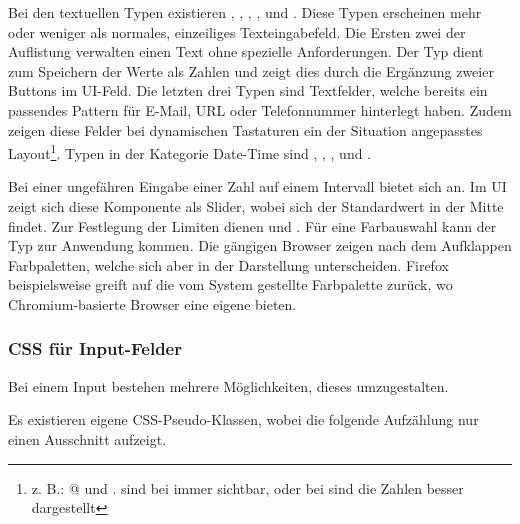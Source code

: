 Bei den textuellen Typen existieren , , , ,  und . 
Diese Typen erscheinen mehr oder weniger als normales, einzeiliges Texteingabefeld. 
Die Ersten zwei der Auflistung verwalten einen Text ohne spezielle Anforderungen. 
Der Typ  dient zum Speichern der Werte als Zahlen und zeigt dies durch die Ergänzung zweier Buttons im UI-Feld. 
Die letzten drei Typen sind Textfelder, welche bereits ein passendes Pattern für E-Mail, URL oder Telefonnummer hinterlegt haben. 
Zudem zeigen diese Felder bei dynamischen Tastaturen ein der Situation angepasstes Layout\footnote{
    z. B.: @ und . sind bei  immer sichtbar, oder bei  sind die Zahlen besser dargestellt
}. 
Typen in der Kategorie Date-Time sind , , ,  und . 

Bei einer ungefähren Eingabe einer Zahl auf einem Intervall bietet sich  an. 
Im UI zeigt sich diese Komponente als Slider, wobei sich der Standardwert in der Mitte findet. 
Zur Festlegung der Limiten dienen  und . 
Für eine Farbauswahl kann der Typ  zur Anwendung kommen. 
Die gängigen Browser zeigen nach dem Aufklappen Farbpaletten, welche sich aber in der Darstellung unterscheiden. 
Firefox beispielsweise greift auf die vom System gestellte Farbpalette zurück, wo Chromium-basierte Browser eine eigene bieten. 


\subsubsection{\color{dblue} {\color{dgray} CSS für Input-Felder}}
\label{sec:inputCss}

Bei einem Input bestehen mehrere Möglichkeiten, dieses umzugestalten. 

Es existieren eigene CSS-Pseudo-Klassen, wobei die folgende Aufzählung nur einen Ausschnitt aufzeigt. 

